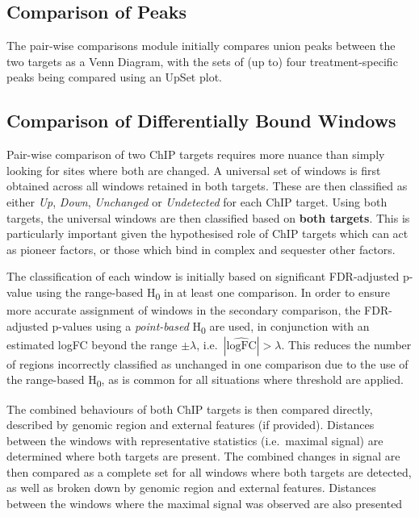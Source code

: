\documentclass[
]{book}
\begin{document}
\hypertarget{comparison-of-peaks}{%
\subsection*{Comparison of Peaks}\label{comparison-of-peaks}}

The pair-wise comparisons module initially compares union peaks between the two targets as a Venn Diagram, with the sets of (up to) four treatment-specific peaks being compared using an UpSet plot.

\hypertarget{comparison-of-differentially-bound-windows}{%
\subsection*{Comparison of Differentially Bound Windows}\label{comparison-of-differentially-bound-windows}}

Pair-wise comparison of two ChIP targets requires more nuance than simply looking for sites where both are changed.
A universal set of windows is first obtained across all windows retained in both targets.
These are then classified as either \emph{Up}, \emph{Down}, \emph{Unchanged} or \emph{Undetected} for each ChIP target.
Using both targets, the universal windows are then classified based on \textbf{both targets}.
This is particularly important given the hypothesised role of ChIP targets which can act as pioneer factors\citep{pioneerfactors}, or those which bind in complex and sequester other factors\citep{hickeynatmed}.

The classification of each window is initially based on significant FDR-adjusted p-value using the range-based H\textsubscript{0} in at least one comparison.
In order to ensure more accurate assignment of windows in the secondary comparison, the FDR-adjusted p-values using a \emph{point-based} H\textsubscript{0} are used, in conjunction with an estimated logFC beyond the range \(\pm\lambda\), i.e.~\(|\widehat{\text{logFC}}| > \lambda\).
This reduces the number of regions incorrectly classified as unchanged in one comparison due to the use of the range-based H\textsubscript{0}, as is common for all situations where threshold are applied.

The combined behaviours of both ChIP targets is then compared directly, described by genomic region and external features (if provided).
Distances between the windows with representative statistics (i.e.~maximal signal) are determined where both targets are present.
The combined changes in signal are then compared as a complete set for all windows where both targets are detected, as well as broken down by genomic region and external features.
Distances between the windows where the maximal signal was observed are also presented
\end{document}
